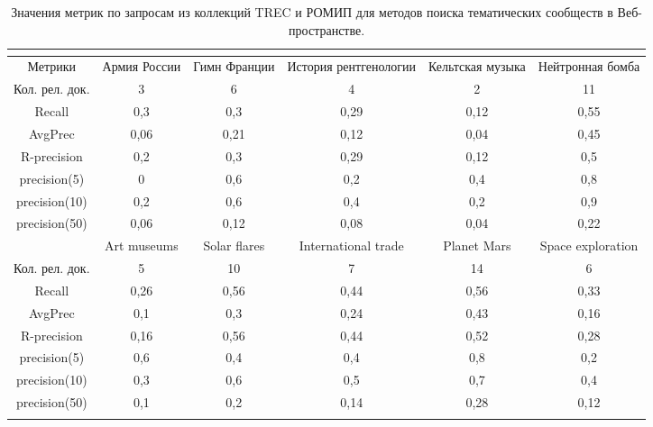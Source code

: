 \begin{table}[ht]%
	\centering
	\caption{Значения метрик по запросам из коллекций TREC и РОМИП для методов поиска тематических сообществ в Веб-пространстве.}%
	\label{tab:metricsROMIPTREC}%
	\begin{adjustbox}{width=0.9\textwidth}
		\small
		\begin{tabular}{| c | c | c | c | c | c |}%
			\hline
			\\
			\hline
			Метрики & Армия России & Гимн Франции & История рентгенологии &  Кельтская музыка &  Нейтронная бомба \\
			\hline
			Кол. рел. док. & 3 & 6 & 4 & 2 & 11  \\
			\hline
			Recall & 0,3 & 0,3 & 0,29 & 0,12 & 0,55 \\
			\hline
			AvgPrec & 0,06 & 0,21 & 0,12 & 0,04 & 0,45  \\
			\hline
			R-precision & 0,2 & 0,3 & 0,29 & 0,12 & 0,5  \\
			\hline
			precision(5) & 0 & 0,6 & 0,2 & 0,4 & 0,8  \\
			\hline
			precision(10) & 0,2 & 0,6 & 0,4 & 0,2 & 0,9  \\
			\hline
			precision(50) & 0,06 & 0,12 & 0,08 & 0,04 & 0,22  \\
			\hline
			& Art museums & Solar flares & International trade &  Planet Mars &  Space exploration \\
			\hline
			Кол. рел. док. & 5 & 10 & 7 & 14 & 6  \\
			\hline
			Recall & 0,26 & 0,56 & 0,44 & 0,56 & 0,33 \\
			\hline
			AvgPrec & 0,1 & 0,3 & 0,24 & 0,43 & 0,16  \\
			\hline
			R-precision & 0,16 & 0,56 & 0,44 & 0,52 & 0,28  \\
			\hline
			precision(5) & 0,6 & 0,4 & 0,4 & 0,8 & 0,2  \\
			\hline
			precision(10) & 0,3 & 0,6 & 0,5 & 0,7 & 0,4  \\
			\hline
			precision(50) & 0,1 & 0,2 & 0,14 & 0,28 & 0,12  \\
			\hline
			\\

\end{tabular}
\end{adjustbox}
\end{table}
